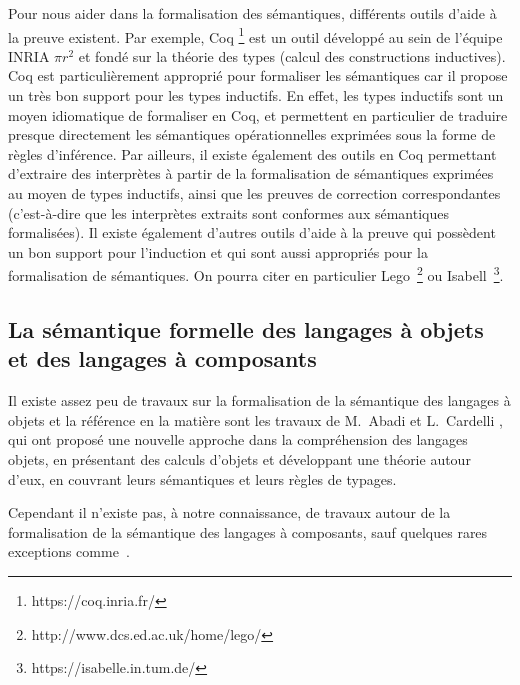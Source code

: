         Pour nous aider dans la formalisation des sémantiques, différents outils d'aide à la preuve existent. Par exemple, Coq \footnote{https://coq.inria.fr/} est un outil développé au sein de l’équipe INRIA $\pi$$r^{2}$ et fondé sur la théorie des types (calcul des constructions inductives). Coq est particulièrement approprié pour formaliser les sémantiques car il propose un très bon support pour les types inductifs. En effet, les types inductifs sont un moyen idiomatique de formaliser en Coq, et permettent en particulier de traduire presque directement les sémantiques opérationnelles exprimées sous la forme de règles d'inférence. Par ailleurs, il existe également des outils en Coq \cite{Rel-Exec3} permettant d'extraire des interprètes à partir de la formalisation de sémantiques exprimées au moyen de types inductifs, ainsi que les preuves de correction correspondantes (c'est-à-dire que les interprètes extraits sont conformes aux sémantiques formalisées). Il existe également d'autres outils d'aide à la preuve qui possèdent un bon support pour l'induction et qui sont aussi appropriés pour la formalisation de sémantiques. On pourra citer en particulier Lego~\footnote{http://www.dcs.ed.ac.uk/home/lego/} ou Isabell~\footnote{https://isabelle.in.tum.de/}.
        
  \subsection{La sémantique formelle des langages à objets et des langages à composants}
  
       Il existe assez peu de travaux sur la formalisation de la sémantique des langages à objets et la référence en la matière sont les travaux de M.~Abadi et L.~Cardelli \cite{Abadi:1996:TO:547964}, qui ont proposé une nouvelle approche dans la compréhension des langages objets, en présentant des calculs d'objets et développant une théorie  autour d'eux, en couvrant leurs sémantiques et leurs règles de typages.
      
      Cependant il n'existe pas, à notre connaissance, de travaux autour de la formalisation de la sémantique des langages à composants, sauf quelques rares exceptions comme~\cite{peschanski2001typeful}.
        
      

